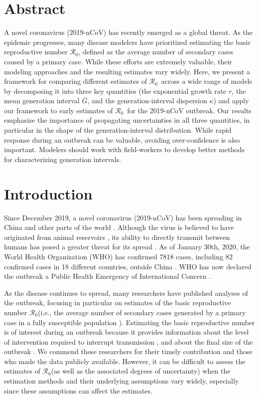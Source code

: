 \documentclass[12pt]{article}
\newcommand{\Rx}[1]{\ensuremath{{\mathcal R}_{#1}}}
\newcommand{\Ro}{\Rx{0}\xspace}
\begin{document}
\section*{Abstract}
A novel coronavirus (2019-nCoV) has recently emerged as a global threat. 
As the epidemic progresses, many disease modelers have prioritized estimating the basic reproductive number \Ro, defined as the average number of secondary cases caused by a primary case.
While these efforts are extremely valuable, their modeling approaches and the resulting estimates vary widely.
Here, we present a framework for comparing different estimates of \Ro\ across a wide range of models by decomposing it into three key quantities (the exponential growth rate $r$, the mean generation interval $\bar G$, and the generation-interval dispersion $\kappa$) and apply our framework to early estimates of \Ro\ for the 2019-nCoV outbreak.
Our results emphasize the importance of propagating uncertainties in all three quantities, in particular in the shape of the generation-interval distribution.
While rapid response during an outbreak can be valuable, avoiding over-confidence is also important.
Modelers should work with field-workers to develop better methods for characterizing generation intervals.

\pagebreak

\section{Introduction}

Since December 2019, a novel coronavirus (2019-nCoV) has been spreading in China and other parts of the world \citep{pneumonia}.
Although the virus is believed to have originated from animal reservoirs \citep{cdcncov}, its ability to directly transmit between humans has posed a greater threat for its spread \citep{huang2020clinical,who26report}.
As of January 30th, 2020, the World Health Organization (WHO) has confirmed 7818 cases, including 82 confirmed cases in 18 different countries, outside China \citep{who28report}.
WHO has now declared the outbreak a Public Health Emergency of International Concern \citep{whoemer}.

As the disease continues to spread, many researchers have published analyses of the outbreak, focusing in particular on estimates of the basic reproductive number \Ro (i.e., the average number of secondary cases generated by a primary case in a fully susceptible population \citep{anderson1991infectious, diekmann1990definition}).
Estimating the basic reproductive number is of interest during an outbreak because it provides information about the level of intervention required to interrupt transmission \citep{anderson1991infectious}, and about the final size of the outbreak \citep{anderson1991infectious, ma2006generality}.
We commend these researchers for their timely contribution and those who made the data publicly available.
However, it can be difficult to assess the estimates of \Ro (as well as the associated degrees of uncertainty) when the estimation methods and their underlying assumptions vary widely, especially since these assumptions can affect the estimates.
\end{document}
